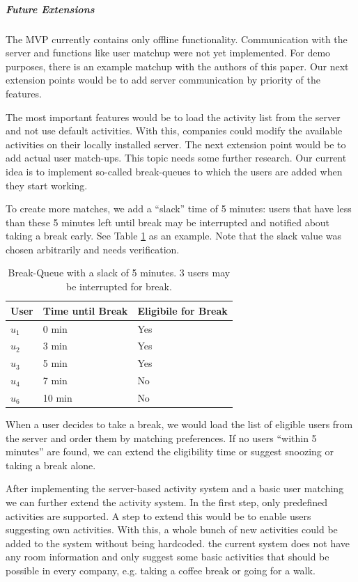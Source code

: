 \subparagraph{Future Extensions}
The MVP currently contains only offline functionality. Communication with the server and functions like user matchup were not yet implemented. For demo purposes, there is an example matchup with the authors of this paper. Our next extension points would be to add server communication by priority of the features.

The most important features would be to load the activity list from the server and not use default activities. With 
this, companies could modify the available activities on their locally installed server. The next extension point 
would be to add actual user match-ups. This topic needs some further research. Our current idea is to implement 
so-called break-queues to which the users are added when they start working. 

To create more matches, we add a ``slack'' time of 5 minutes: users that have less than these 5 minutes left until 
break may be interrupted and notified about taking a break early. See Table \ref{tab:break-queues} as an example. Note 
that the slack value was chosen arbitrarily and needs verification.

\begin{table}[ht]
 \centering
 \begin{tabular}{lll}
  \textbf{User} & \textbf{Time until Break} & \textbf{Eligibile for Break} \\
  \hline
  \(u_1\) &  0 min & Yes \\
  \(u_2\) &  3 min & Yes \\
  \(u_3\) &  5 min & Yes \\
  \(u_4\) &  7 min & No \\
  \(u_6\) & 10 min & No \\
  \hline
 \end{tabular}
 \caption{Break-Queue with a slack of 5 minutes. 3 users may be interrupted for break.}
 \label{tab:break-queues}
\end{table}

When a user decides to take a break, we would load the list of eligible users from the server and order them by matching preferences. If no 
users ``within 5 minutes'' are found, we can extend the eligibility time or suggest snoozing or taking a break alone. 


After implementing the server-based activity system and a basic user matching we can further extend the activity 
system. In the first step, only predefined activities are supported. A step to extend this would be to enable users 
suggesting own activities. With this, a whole bunch of new activities could be added to the system without being 
hardcoded. the current system does not have any room information and only suggest some basic activities that should be 
possible in every company, e.g. taking a coffee break or going for a walk. 


